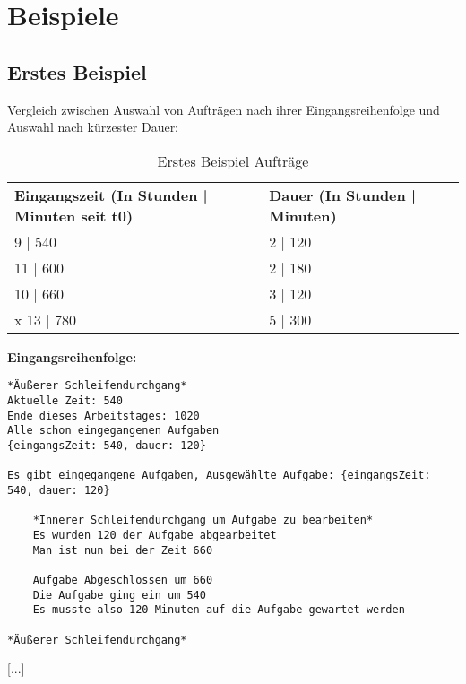 \documentclass[a4paper,10pt,ngerman]{scrartcl}
\begin{document}
\section{Beispiele}\label{sec:beispiele}
\subsection{Erstes Beispiel}\label{sec:beispiel1}
Vergleich zwischen Auswahl von Aufträgen nach ihrer Eingangsreihenfolge
und Auswahl nach kürzester Dauer: 
 \begin{table}[htb]
    \centering
    \begin{tabular}{lll}
    \textbf{Eingangszeit (In Stunden | Minuten seit t0)} & \textbf{Dauer (In Stunden | Minuten)} \\
    9 | 540 & 2 | 120 \\
    11 | 600 & 2 | 180 \\
    10 | 660 & 3 | 120 \\
x    13 | 780 & 5 | 300 \\
    \end{tabular}
    \caption{Erstes Beispiel Aufträge}
    \label{tab:Table1}
 \end{table}
\newpage
\textbf{Eingangsreihenfolge:}
\begin{lstlisting}[numbers=none]
*Äußerer Schleifendurchgang*
Aktuelle Zeit: 540
Ende dieses Arbeitstages: 1020
Alle schon eingegangenen Aufgaben
{eingangsZeit: 540, dauer: 120}

Es gibt eingegangene Aufgaben, Ausgewählte Aufgabe: {eingangsZeit: 540, dauer: 120}

    *Innerer Schleifendurchgang um Aufgabe zu bearbeiten*
    Es wurden 120 der Aufgabe abgearbeitet
    Man ist nun bei der Zeit 660

    Aufgabe Abgeschlossen um 660
    Die Aufgabe ging ein um 540
    Es musste also 120 Minuten auf die Aufgabe gewartet werden
    
*Äußerer Schleifendurchgang*
\end{lstlisting}
[...]
\end{document}
